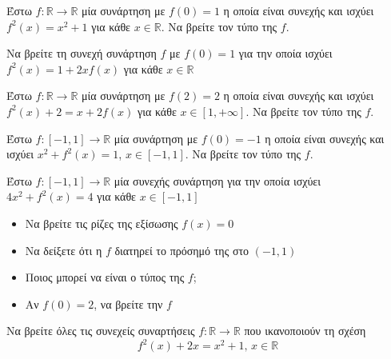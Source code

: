 \documentclass{presentation}
\begin{document}
\begin{askisi}
  Έστω $f:\mathbb{R}\to\mathbb{R}$ μία συνάρτηση με $f(0)=1$ η οποία είναι συνεχής και ισχύει $f^2(x)=x^2+1$ για κάθε $x\in\mathbb{R}$. Να βρείτε τον τύπο της $f$.
\end{askisi}

\begin{askisi}
  Να βρείτε τη συνεχή συνάρτηση $f$ με $f(0)=1$ για την οποία ισχύει $f^2(x)=1+2xf(x)$ για κάθε $x\in\mathbb{R}$
\end{askisi}

\begin{askisi}
  Έστω $f:\mathbb{R}\to\mathbb{R}$ μία συνάρτηση με $f(2)=2$ η οποία είναι συνεχής και ισχύει $f^2(x)+2=x+2f(x)$ για κάθε $x\in [1,+\infty]$. Να βρείτε τον τύπο της $f$.
\end{askisi}

\begin{askisi}
  Έστω $f:[-1,1]\to\mathbb{R}$ μία συνάρτηση με $f(0)=-1$ η οποία είναι συνεχής και ισχύει $x^2+f^2(x)=1$, $x\in [-1,1]$. Να βρείτε τον τύπο της $f$.
\end{askisi}

\begin{askisi}
  Έστω $f:[-1,1]\to\mathbb{R}$ μία συνεχής συνάρτηση για την οποία ισχύει $4x^2+f^2(x)=4$ για κάθε $x\in [-1,1]$
  \begin{itemize}[<+->]
    \item Να βρείτε τις ρίζες της εξίσωσης $f(x)=0$
    \item Να δείξετε ότι η $f$ διατηρεί το πρόσημό της στο $(-1,1)$
    \item Ποιος μπορεί να είναι ο τύπος της $f$;
    \item Αν $f(0)=2$, να βρείτε την $f$
  \end{itemize}
\end{askisi}

\begin{askisi}
  Να βρείτε όλες τις συνεχείς συναρτήσεις $f:\mathbb{R}\to\mathbb{R}$ που ικανοποιούν τη σχέση
  $$f^2(x)+2x=x^2+1 \text{, } x\in\mathbb{R}$$
\end{askisi}
\end{document}
